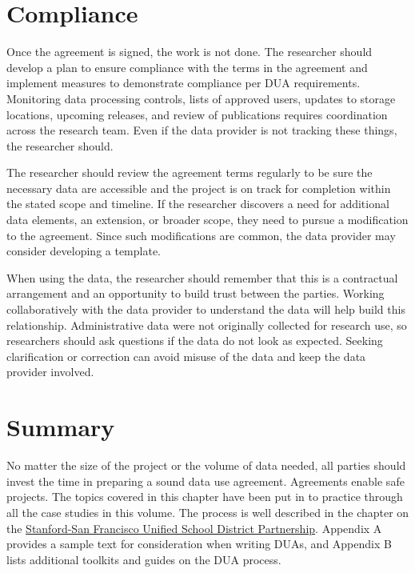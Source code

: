 \documentclass[
]{book}
\begin{document}
\hypertarget{compliance}{%
\section{Compliance}\label{compliance}}

Once the agreement is signed, the work is not done. The researcher should develop a plan to ensure compliance with the terms in the agreement and implement measures to demonstrate compliance per DUA requirements. Monitoring data processing controls, lists of approved users, updates to storage locations, upcoming releases, and review of publications requires coordination across the research team. Even if the data provider is not tracking these things, the researcher should.

The researcher should review the agreement terms regularly to be sure the necessary data are accessible and the project is on track for completion within the stated scope and timeline. If the researcher discovers a need for additional data elements, an extension, or broader scope, they need to pursue a modification to the agreement. Since such modifications are common, the data provider may consider developing a template.

When using the data, the researcher should remember that this is a contractual arrangement and an opportunity to build trust between the parties. Working collaboratively with the data provider to understand the data will help build this relationship. Administrative data were not originally collected for research use, so researchers should ask questions if the data do not look as expected. Seeking clarification or correction can avoid misuse of the data and keep the data provider involved.

\hypertarget{summary}{%
\section{Summary}\label{summary}}

No matter the size of the project or the volume of data needed, all parties should invest the time in preparing a sound data use agreement. Agreements enable safe projects. The topics covered in this chapter have been put in to practice through all the case studies in this volume. The process is well described in the chapter on the \protect\hyperlink{sfusd}{Stanford-San Francisco Unified School District Partnership}. Appendix A provides a sample text for consideration when writing DUAs, and Appendix B lists additional toolkits and guides on the DUA process.
\end{document}
